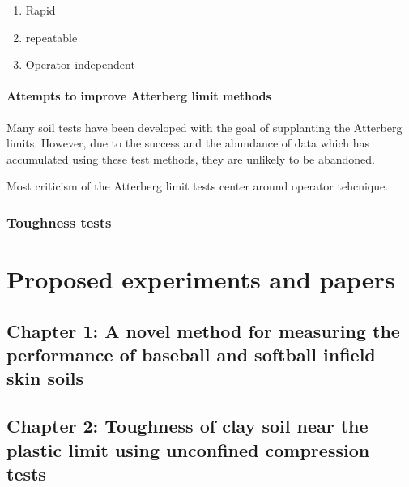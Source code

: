 \documentclass[
]{book}
\providecommand{\tightlist}{%
  \setlength{\itemsep}{0pt}\setlength{\parskip}{0pt}}
\begin{document}
\begin{enumerate}
\def\labelenumi{\arabic{enumi}.}
\tightlist
\item
  Rapid
\item
  repeatable
\item
  Operator-independent
\end{enumerate}

\hypertarget{attempts-to-improve-atterberg-limit-methods}{%
\subsubsection{Attempts to improve Atterberg limit methods}\label{attempts-to-improve-atterberg-limit-methods}}

Many soil tests have been developed with the goal of supplanting the Atterberg limits. However, due to the success and the abundance of data which has accumulated using these test methods, they are unlikely to be abandoned.

Most criticism of the Atterberg limit tests center around operator tehcnique.

\hypertarget{toughness-tests}{%
\subsection{Toughness tests}\label{toughness-tests}}

\hypertarget{proposed-experiments}{%
\chapter{Proposed experiments and papers}\label{proposed-experiments}}

\hypertarget{chapter-1-a-novel-method-for-measuring-the-performance-of-baseball-and-softball-infield-skin-soils}{%
\section{Chapter 1: A novel method for measuring the performance of baseball and softball infield skin soils}\label{chapter-1-a-novel-method-for-measuring-the-performance-of-baseball-and-softball-infield-skin-soils}}

\hypertarget{chapter-2-toughness-of-clay-soil-near-the-plastic-limit-using-unconfined-compression-tests}{%
\section{Chapter 2: Toughness of clay soil near the plastic limit using unconfined compression tests}\label{chapter-2-toughness-of-clay-soil-near-the-plastic-limit-using-unconfined-compression-tests}}
\end{document}
